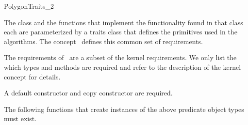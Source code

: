 

\begin{ccRefConcept}{PolygonTraits_2}


\ccDefinition

The  class and the functions that implement the functionality
found in that class each are parameterized by a traits class that defines the
primitives used in the algorithms.
The concept \ccRefName\ defines this common set of requirements.

The requirements of \ccRefName\ are a subset of the kernel requirements.
We only list the which types and methods are required and refer to the
description of the kernel concept for details.

\ccTypes


\ccCreation
{}  

A default constructor and copy constructor are required.

\ccOperations

The following functions that create instances of the above predicate object
types must exist.







\end{ccRefConcept}
